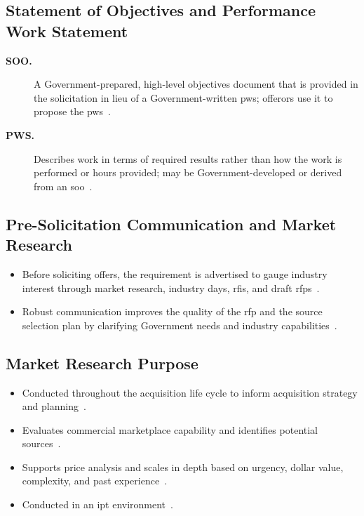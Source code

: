 \documentclass[../main.tex]{subfiles}
\begin{document}
\subsection{Statement of Objectives and Performance Work Statement}
\begin{description}
  \item[\textbf{SOO.}] A Government-prepared, high-level objectives document that is provided in the solicitation in lieu of a Government-written \ac{pws}; offerors use it to propose the \ac{pws}~\autocite{edo-3-2-2-solicitation-prep-2025}.
  \item[\textbf{PWS.}] Describes work in terms of required results rather than how the work is performed or hours provided; may be Government-developed or derived from an \ac{soo}~\autocite{edo-3-2-2-solicitation-prep-2025}.
\end{description}

\subsection{Pre-Solicitation Communication and Market Research}
\begin{itemize}
  \item Before soliciting offers, the requirement is advertised to gauge industry interest through market research, industry days, \acp{rfi}, and draft \acp{rfp}~\autocite{edo-3-2-2-solicitation-prep-2025}.
  \item Robust communication improves the quality of the \ac{rfp} and the source selection plan by clarifying Government needs and industry capabilities~\autocite{edo-3-2-2-solicitation-prep-2025}.
\end{itemize}

\subsection{Market Research Purpose}
\begin{itemize}
  \item Conducted throughout the acquisition life cycle to inform acquisition strategy and planning~\autocite{edo-3-2-2-solicitation-prep-2025}.
  \item Evaluates commercial marketplace capability and identifies potential sources~\autocite{edo-3-2-2-solicitation-prep-2025}.
  \item Supports price analysis and scales in depth based on urgency, dollar value, complexity, and past experience~\autocite{edo-3-2-2-solicitation-prep-2025}.
  \item Conducted in an \ac{ipt} environment~\autocite{edo-3-2-2-solicitation-prep-2025}.
\end{itemize}
\end{document}
